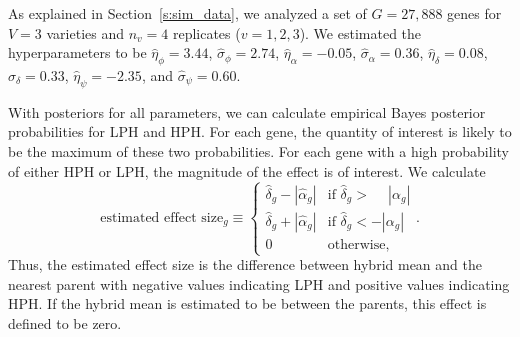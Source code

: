 \documentclass[useAMS,usenatbib,referee]{biom}
\begin{document}
As explained in Section~\ref{s:sim_data}, we analyzed a set of $G=27,888$ genes for $V=3$ varieties and $n_v=4$ replicates ($v=1,2,3$). We estimated the hyperparameters to be $\hat{\eta}_\phi = 3.44$, $\hat{\sigma}_\phi = 2.74$, $\hat{\eta}_\alpha = -0.05$, $\hat{\sigma}_\alpha=0.36$, $\hat{\eta}_\delta = 0.08$, $\hat{\sigma}_\delta=0.33$, $\hat{\eta}_\psi = -2.35$, and $\hat{\sigma}_\psi=0.60$. 

With posteriors for all parameters, we can calculate empirical Bayes posterior probabilities for LPH and HPH. For each gene, the quantity of interest is likely to be the maximum of these two probabilities. For each gene with a high probability of either HPH or LPH, the magnitude of the effect is of interest. We calculate 
\begin{equation}
\mbox{estimated effect size}_g \equiv \left\{ 
\begin{array}{ll}
\hat{\delta}_g - |\hat{\alpha}_g| & \mbox{if } \hat{\delta}_g > \phantom{-}|\alpha_g| \\
\hat{\delta}_g + |\hat{\alpha}_g| & \mbox{if } \hat{\delta}_g < -|\alpha_g| \\
0 & \mbox{otherwise},
\end{array}.
\right. 
\label{e:effect_size}
\end{equation}
Thus, the estimated effect size is the difference between hybrid mean and the nearest parent with negative values indicating LPH and positive values indicating HPH. If the hybrid mean is estimated to be between the parents, this effect is defined to be zero. 
\end{document}
